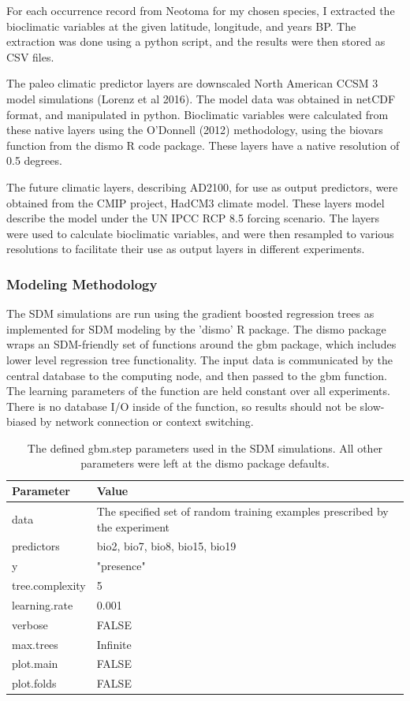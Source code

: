 \documentclass[a4paper]{article}
\begin{document}
For each occurrence record from Neotoma for my chosen species, I extracted the bioclimatic variables at the given latitude, longitude, and years BP. The extraction was done using a python script, and the results were then stored as CSV files.

The paleo climatic predictor layers are downscaled North American CCSM 3 model simulations (Lorenz et al 2016).  The model data was obtained in netCDF format, and manipulated in python.  Bioclimatic variables were calculated from these native layers using the O'Donnell (2012) methodology, using the biovars function from the dismo R code package.  These layers have a native resolution of 0.5 degrees.

The future climatic layers, describing AD2100, for use as output predictors, were obtained from the CMIP project, HadCM3 climate model.  These layers model describe the model under the UN IPCC RCP 8.5 forcing scenario.  The layers were used to calculate bioclimatic variables, and were then resampled to various resolutions to facilitate their use as output layers in different experiments.

\subsubsection{Modeling Methodology}
The SDM simulations are run using the gradient boosted regression trees as implemented for SDM modeling by the 'dismo' R package.  The dismo package wraps an SDM-friendly set of functions around the gbm package, which includes lower level regression tree functionality. The input data is communicated by the central database to the computing node, and then passed to the gbm function.  The learning parameters of the function are held constant over all experiments.  There is no database I/O inside of the function, so results should not be slow-biased by network connection or context switching.  


\begin{table}
\centering
\begin{tabular}{l|l}
Parameter & Value \\\hline
data & The specified set of random training examples prescribed by the  experiment\\
predictors & bio2, bio7, bio8, bio15, bio19\\
y & "presence"\\
tree.complexity & 5\\
learning.rate & 0.001\\
verbose & FALSE \\
max.trees & Infinite\\
plot.main & FALSE \\
plot.folds & FALSE \\
\end{tabular}
\caption{\label{tab:params} The defined gbm.step parameters used in the SDM simulations.  All other parameters were left at the dismo package defaults.} 
\end{table}
\end{document}
